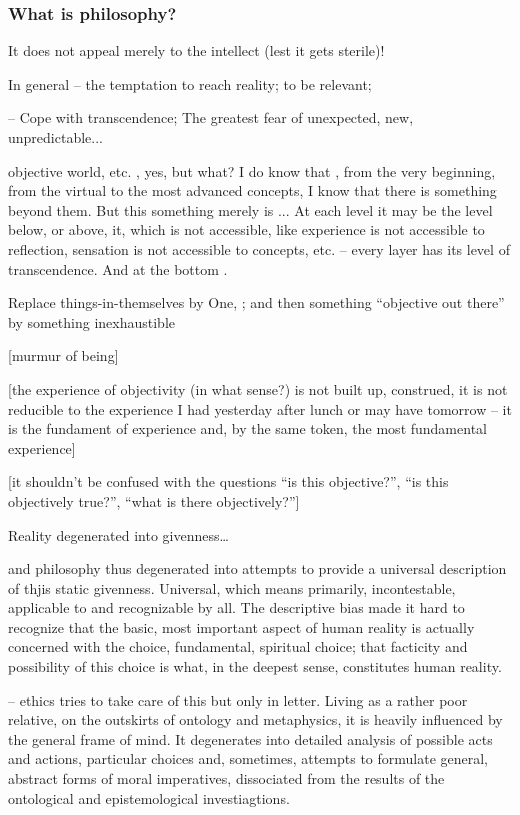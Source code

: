 {\subsubsection{What is philosophy?}

It does not appeal merely to the intellect (lest it gets sterile)!


In general -- the temptation to reach reality; to be relevant; 

-- Cope with transcendence; {The greatest fear}
of unexpected, new, unpredictable...


 objective world, etc. , yes, but what? 
I do know that , from the very beginning, from the virtual 
 to the most advanced concepts, I know that there is 
something beyond them. But this something merely is ... At each level it 
may be the level below, or above, it, which is not accessible, like 
experience is not accessible to reflection, sensation is not accessible to 
concepts, etc. -- every layer has its level of transcendence. And at the 
bottom  . 

Replace things-in-themselves by One, ; and then something 
``objective out there'' by something inexhaustible

[murmur of being]

[the experience of objectivity (in what sense?) is not built up, 
construed, it is not reducible to the experience I had yesterday after 
lunch or may have tomorrow -- it is the fundament of experience and, by the 
same token, the most fundamental experience]

[it shouldn't be confused with the questions ``is this objective?'', ``is 
this objectively true?'', ``what is there objectively?'']


\pa
Reality degenerated into givenness\ldots

and philosophy thus degenerated into attempts to provide a universal 
description of thjis static givenness. Universal, which means 
primarily, incontestable, applicable to and recognizable by all. The 
descriptive bias made it hard to recognize that the basic, most 
important aspect of human reality is actually concerned with the 
choice, fundamental, spiritual choice; that facticity and possibility 
of this choice is what, in the deepest sense, constitutes human reality. 

-- ethics tries to take care of this but only in letter. Living as a 
rather poor relative, on the outskirts of ontology and metaphysics, 
it is heavily influenced by the general frame of mind. It degenerates 
into detailed analysis of possible acts and actions, particular 
choices and, sometimes, attempts to formulate general, abstract forms of 
moral imperatives, dissociated from the results of the ontological and 
epistemological investiagtions.

}
